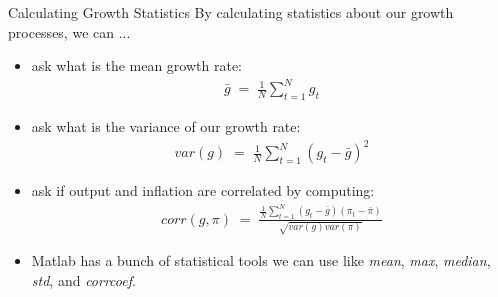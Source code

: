 \documentclass[10pt,c,aspectratio=1610,handout]{beamer}
\begin{document}
\begin{frame}{Calculating Growth Statistics}%
  By calculating statistics about our growth processes, we can ...%
  \begin{small}%
    \begin{itemize}%
      \item[$\blacktriangleright$] ask what is the mean growth rate:%
      \begin{align*}%
        \bar g \; = \; \frac{1}{N} \sum_{t=1}^N g_t%
      \end{align*}%
      \pause%
      \item[$\blacktriangleright$] ask what is the variance of our growth rate:%
      \begin{align*}%
        var(g) \; = \; \frac{1}{N} \sum_{t=1}^N (g_t - \bar g)^2
      \end{align*}%
      \pause%
      \item[$\blacktriangleright$] ask if output and inflation are correlated by computing:%
      \begin{align*}%
        corr(g,\pi) \; = \; \frac{ \frac{1}{N} \sum_{t=1}^N (g_t - \bar g)(\pi_t - \bar \pi) }{\sqrt{var(g)var(\pi)}}%
      \end{align*}%
      \pause%
      \item[$\blacktriangleright$] Matlab has a bunch of statistical tools we can use like \emph{mean}, \emph{max}, \emph{median}, \emph{std}, and \emph{corrcoef}.%
    \end{itemize}%
  \end{small}%
\end{frame}%
\end{document}
